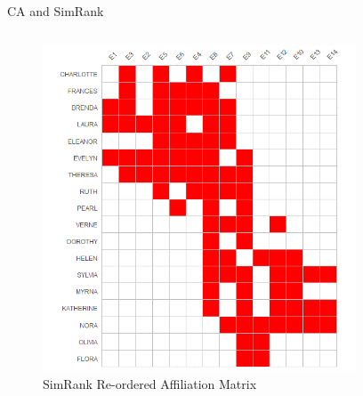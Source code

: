\documentclass[
  ignorenonframetext,
]{beamer}
\begin{document}
\begin{frame}{CA and SimRank}
\protect\hypertarget{ca-and-simrank-4}{}
\begin{columns}[T]
\begin{column}{0.5\textwidth}
\begin{figure}

{\centering \includegraphics{Plots/sr-plot-reord.png}

}

\caption{SimRank Re-ordered Affiliation Matrix}

\end{figure}
\end{column}

\begin{column}{0.5\textwidth}
\begin{figure}


\end{figure}
\end{column}
\end{columns}
\end{frame}
\end{document}
